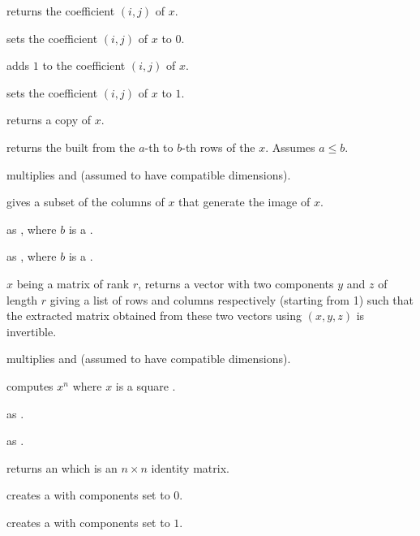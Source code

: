  returns the coefficient $(i,j)$
of $x$.

 sets the coefficient $(i,j)$ of $x$
to $0$.

 adds $1$ to the coefficient $(i,j)$
of $x$.

 sets the coefficient $(i,j)$ of $x$
to $1$.

 returns a copy of $x$.

 returns the  built
from the $a$-th to $b$-th rows of the  $x$. Assumes $a \leq b$.

 multiplies   and  (assumed
to have compatible dimensions).

 gives a subset of the columns of $x$ that generate
the image of $x$.



as , where $b$ is a .

as , where $b$ is a .


 $x$ being a matrix of rank $r$, returns a
vector with two  components $y$ and $z$ of length $r$ giving a
list of rows and columns respectively (starting from 1) such that the extracted
matrix obtained from these two vectors using $(x,y,z)$ is
invertible.

 multiplies   and  (assumed to
have compatible dimensions).

 computes $x^n$ where $x$ is a square
.

 as .

 as .

 returns an  which is an $n \times n$
identity matrix.

 creates a  with  components set to
$0$.

 creates a  with  components set to
$1$.

